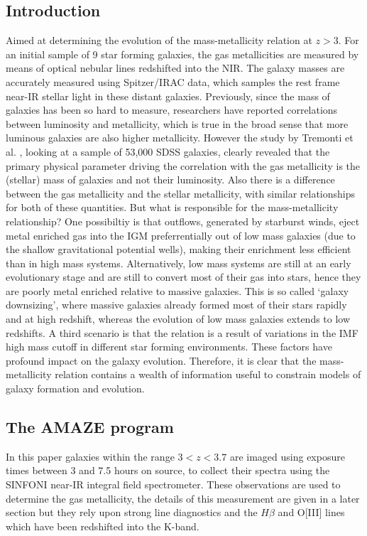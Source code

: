\documentclass{literature}
\begin{document}
\subsection{Introduction}
\citep{Maiolino_2008} Aimed at determining the evolution of the mass-metallicity relation at $z > 3$. For an initial sample of 9 star forming galaxies, the gas metallicities are measured by means of optical nebular lines redshifted into the NIR. The galaxy masses are accurately measured using Spitzer/IRAC data, which samples the rest frame near-IR stellar light in these distant galaxies. Previously, since the mass of galaxies has been so hard to measure, researchers have reported correlations between luminosity and metallicity, which is true in the broad sense that more luminous galaxies are also higher metallicity. However the study by Tremonti et al. \citep{Tremonti_2004}, looking at a sample of 53,000 SDSS galaxies, clearly revealed that the primary physical parameter driving the correlation with the gas metallicity is the (stellar) mass of galaxies and not their luminosity. Also there is a difference between the gas metallicity and the stellar metallicity, with similar relationships for both of these quantities. But what is responsible for the mass-metallicity relationship? One possibiltiy is that outflows, generated by starburst winds, eject metal enriched gas into the IGM preferrentially out of low mass galaxies (due to the shallow gravitational potential wells), making their enrichment less efficient than in high mass systems. Alternatively, low mass systems are still at an early evolutionary stage and are still to convert most of their gas into stars, hence they are poorly metal enriched relative to massive galaxies. This is so called `galaxy downsizing', where massive galaxies already formed most of their stars rapidly and at high redshift, whereas the evolution of low mass galaxies extends to low redshifts. A third scenario is that the relation is a result of variations in the IMF high mass cutoff in different star forming environments. These factors have profound impact on the galaxy evolution. Therefore, it is clear that the mass-metallicity relation contains a wealth of information useful to constrain models of galaxy formation and evolution. 
\subsection{The AMAZE program}
In this paper galaxies within the range $3 < z < 3.7$ are imaged using exposure times between 3 and 7.5 hours on source, to collect their spectra using the SINFONI near-IR integral field spectrometer. These observations are used to determine the gas metallicity, the details of this measurement are given in a later section but they rely upon strong line diagnostics and the $H \beta$ and O[III] lines which have been redshifted into the K-band.
\end{document}
